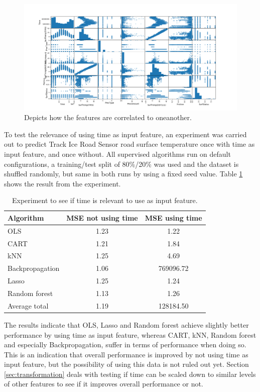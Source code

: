 \begin{figure}[H] 
	\centering
	\includegraphics[width=1\textwidth]{media/relationship_parameters_pre_noerr.png}
	\caption{Depicts how the features are correlated to oneanother.}
	\label{img:correlations_noerr}
\end{figure}

	To test the relevance of using time as input feature, an experiment was carried out to predict Track Ice Road Sensor road surface temperature once with time as input feature, and once without. All supervised algorithms run on default configurations, a training/test split of 80\%/20\% was used and the dataset is shuffled randomly, but same in both runs by using a fixed seed value. Table \ref{table:timeinput} shows the result from the experiment.

	\begin{table}[H]
	\centering
	\caption{Experiment to see if time is relevant to use as input feature. }
		\begin{tabular}[3]{l | c | c}
    			Algorithm & MSE not using time & MSE using time \\
    			\hline
			OLS & 1.23 & 1.22 \\
			CART & 1.21 & 1.84 \\
			kNN & 1.25 & 4.69 \\
			Backpropagation & 1.06 & 769096.72 \\
			Lasso & 1.25 & 1.24 \\
			Random forest & 1.13 & 1.26 \\
			\hline
			Average total & 1.19 & 128184.50
			\label{table:timeinput}
		\end{tabular}
	\end{table}

	The results indicate that OLS, Lasso and Random forest achieve slightly better performance by using time as input feature, whereas CART, kNN, Random forest and especially Backpropagation, suffer in terms of performance when doing so. This is an indication that overall performance is improved by not using time as input feature, but the possibility of using this data is not ruled out yet. Section \ref{sec:transformation} deals with testing if time can be scaled down to similar levels of other features to see if it improves overall performance or not.

